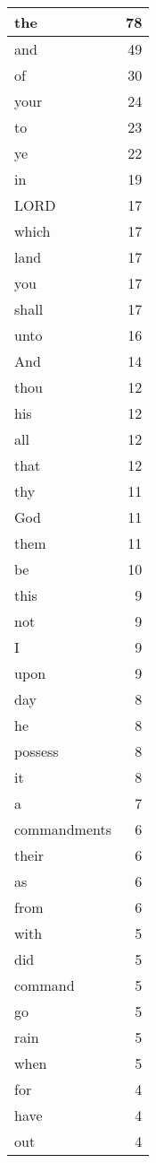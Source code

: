 \begin{center}
\begin{longtable}{l|r}
\hline \hline
\endlastfoot
the & 78 \\ \hline
and & 49 \\ \hline
of & 30 \\ \hline
your & 24 \\ \hline
to & 23 \\ \hline
ye & 22 \\ \hline
in & 19 \\ \hline
LORD & 17 \\ \hline
which & 17 \\ \hline
land & 17 \\ \hline
you & 17 \\ \hline
shall & 17 \\ \hline
unto & 16 \\ \hline
And & 14 \\ \hline
thou & 12 \\ \hline
his & 12 \\ \hline
all & 12 \\ \hline
that & 12 \\ \hline
thy & 11 \\ \hline
God & 11 \\ \hline
them & 11 \\ \hline
be & 10 \\ \hline
this & 9 \\ \hline
not & 9 \\ \hline
I & 9 \\ \hline
upon & 9 \\ \hline
day & 8 \\ \hline
he & 8 \\ \hline
possess & 8 \\ \hline
it & 8 \\ \hline
a & 7 \\ \hline
commandments & 6 \\ \hline
their & 6 \\ \hline
as & 6 \\ \hline
from & 6 \\ \hline
with & 5 \\ \hline
did & 5 \\ \hline
command & 5 \\ \hline
go & 5 \\ \hline
rain & 5 \\ \hline
when & 5 \\ \hline
for & 4 \\ \hline
have & 4 \\ \hline
out & 4 \\ \hline

\end{longtable}
\end{center}
